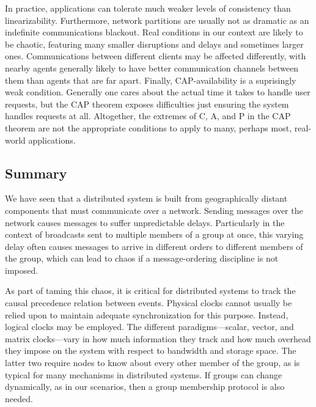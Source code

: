 \documentclass[]             %
{NASA}                       %
\theoremstyle{definition}
\begin{document}
In practice, applications can tolerate much weaker levels of consistency
than linearizability. Furthermore, network partitions are usually not as
dramatic as an indefinite communications blackout. Real conditions in
our context are likely to be chaotic, featuring many smaller disruptions
and delays and sometimes larger ones. Communications between different
clients may be affected differently, with nearby agents generally likely
to have better communication channels between them than agents that are
far apart. Finally, CAP-availability is a suprisingly weak condition.
Generally one cares about the actual time it takes to handle user
requests, but the CAP theorem exposes difficulties just ensuring the
system handles requests at all. Altogether, the extremes of C, A, and P
in the CAP theorem are not the appropriate conditions to apply to many,
perhaps most, real-world applications.


\subsection{Summary}
\label{sec:background-summary}

We have seen that a distributed system is built from geographically
distant components that must communicate over a network. Sending
messages over the network causes messages to suffer unpredictable
delays. Particularly in the context of broadcasts sent to multiple
members of a group at once, this varying delay often causes messages
to arrive in different orders to different members of the group, which
can lead to chaos if a message-ordering discipline is not imposed.

As part of taming this chaos, it is critical for distributed systems
to track the causal precedence relation between events. Physical
clocks cannot usually be relied upon to maintain adequate
synchronization for this purpose. Instead, logical clocks may be
employed. The different paradigms---scalar, vector, and matrix
clocks---vary in how much information they track and how much overhead
they impose on the system with respect to bandwidth and storage
space. The latter two require nodes to know about every other member
of the group, as is typical for many mechanisms in distributed
systems. If groups can change dynamically, as in our scenarios, then a
group membership protocol is also needed.
\end{document}
